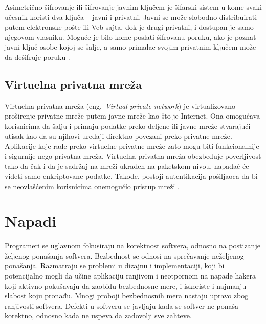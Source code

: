 \documentclass[a4paper]{article}
\begin{document}
Asimetrično šifrovanje ili šifrovanje javnim ključem je šifarski sistem u kome svaki učesnik koristi dva ključa – javni i privatni. Javni se može slobodno distribuirati putem elektronske pošte ili Veb sajta, dok je drugi privatni, i dostupan je samo njegovom vlasniku. Moguće je bilo kome poslati šifrovanu poruku, ako je poznat javni ključ osobe kojoj se šalje, a samo primalac svojim privatnim ključem može da dešifruje poruku \cite{cryptography}.

\subsection{Virtuelna privatna mreža}
\label{subsec:virtuelna privatna mreza}

Virtuelna privatna mreža (eng.~{\em Virtual private network}) je virtualizovano proširenje privatne mreže putem javne mreže kao što je Internet. Ona omogućava korisnicima da šalju i primaju podatke preko deljene ili javne mreže stvarajući utisak kao da su njihovi uređaji direktno povezani preko privatne mreže. Aplikacije koje rade preko virtuelne privatne mreže zato mogu biti funkcionalnije i sigurnije nego privatna mreža. Virtuelna privatna mreža obezbeđuje poverljivost tako da čak i da je sadržaj na mreži ukraden na paketskom nivou, napadač će videti samo enkriptovane podatke. Takođe, postoji autentikacija pošiljaoca da bi se neovlašćenim korisnicima onemogućio pristup
mreži \cite{firewalls}.

\section{Napadi}
\label{sec:napadi}
Programeri se uglavnom fokusiraju na korektnost softvera, odnosno na postizanje željenog ponašanja softvera. Bezbednost se odnosi na sprečavanje neželjenog ponašanja. Razmatraju se problemi u dizajnu i implementaciji, koji bi potencijalno mogli da učine aplikaciju ranjivom i neotpornom na napade hakera koji aktivno pokušavaju da zaobiđu bezbednosne mere, i iskoriste i najmanju slabost koju pronađu. Mnogi proboji bezbednosnih mera nastaju upravo zbog ranjivosti softvera. Defekti u softveru se javljaju kada se softver ne ponaša korektno, odnosno kada ne uspeva da zadovolji sve zahteve.
\end{document}
